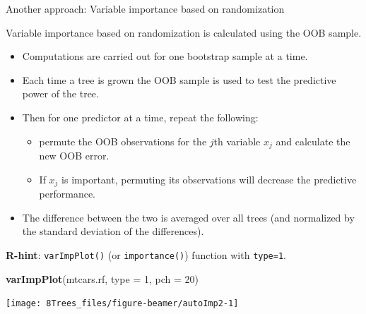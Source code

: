 \documentclass[10pt,ignorenonframetext,]{beamer}
\newenvironment{Shaded}{\begin{snugshade}}{\end{snugshade}}
\newcommand{\KeywordTok}[1]{\textcolor[rgb]{0.13,0.29,0.53}{\textbf{#1}}}
\newcommand{\DataTypeTok}[1]{\textcolor[rgb]{0.13,0.29,0.53}{#1}}
\newcommand{\DecValTok}[1]{\textcolor[rgb]{0.00,0.00,0.81}{#1}}
\newcommand{\NormalTok}[1]{#1}
\providecommand{\tightlist}{%
  \setlength{\itemsep}{0pt}\setlength{\parskip}{0pt}}
\begin{document}
\begin{frame}[fragile]

\begin{block}{Another approach: Variable importance based on
randomization}

\vspace{2mm}

Variable importance based on randomization is calculated using the OOB
sample.

\begin{itemize}
\tightlist
\item
  Computations are carried out for one bootstrap sample at a time.
\item
  Each time a tree is grown the OOB sample is used to test the
  predictive power of the tree.
\item
  Then for one predictor at a time, repeat the following:

  \begin{itemize}
  \tightlist
  \item
    permute the OOB observations for the \(j\)th variable \(x_j\) and
    calculate the new OOB error.
  \item
    If \(x_j\) is important, permuting its observations will decrease
    the predictive performance.
  \end{itemize}
\item
  The difference between the two is averaged over all trees (and
  normalized by the standard deviation of the differences).
\end{itemize}

\vspace{4mm} \textbf{R-hint}: \texttt{varImpPlot()} (or
\texttt{importance()}) function with \texttt{type=1}.

\end{block}

\end{frame}

\begin{frame}[fragile]

\scriptsize

\begin{Shaded}
\begin{Highlighting}[]
\KeywordTok{varImpPlot}\NormalTok{(mtcars.rf, }\DataTypeTok{type =} \DecValTok{1}\NormalTok{, }\DataTypeTok{pch =} \DecValTok{20}\NormalTok{)}
\end{Highlighting}
\end{Shaded}

\begin{center}\texttt{[image: 8Trees\_files/figure-beamer/autoImp2-1]} \end{center}

\end{frame}
\end{document}
